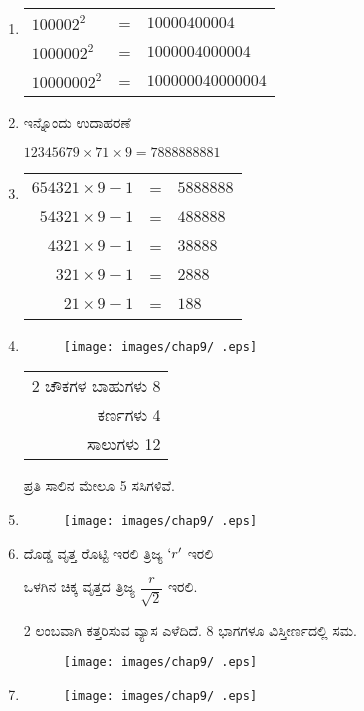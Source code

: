 \begin{enumerate}
\item 
\begin{tabular}[t]{lll}
$100002^{2}$ & = & $10000400004$\\
$1000002^{2}$ & = & $1000004000004$\\
$10000002^{2}$ & = & $100000040000004$\\
\end{tabular}

\item ಇನ್ನೊಂದು ಉದಾಹರಣೆ 

$12345679\times 71\times 9 = 7888888881$

\smallskip
\item 
\begin{tabular}[t]{rcl}
$654321\times 9 - 1$ & = & $5888888$\\
$54321\times 9 - 1$ & = & $488888$\\
$4321\times 9 - 1$ & = & $38888$\\
$321\times 9 - 1$ & = & $2888$\\
$21\times 9 - 1$ & = & $188$
\end{tabular}

\item 
\begin{figure}[!h]
\centering
\texttt{[image: images/chap9/ .eps]}
\end{figure}

\begin{tabular}[t]{r}
2 ಚೌಕಗಳ ಬಾಹುಗಳು 8 \\
ಕರ್ಣಗಳು 4\\
\hline
ಸಾಲುಗಳು 12\\
\hline
\end{tabular}

ಪ್ರತಿ ಸಾಲಿನ ಮೇಲೂ 5 ಸಸಿಗಳಿವೆ. 

\item 
\begin{figure}[!h]
\centering
\texttt{[image: images/chap9/ .eps]}
\end{figure}

\item ದೊಡ್ಡ ವೃತ್ತ ರೊಟ್ಟಿ ಇರಲಿ ತ್ರಿಜ್ಯ $`r'$ ಇರಲಿ 

ಒಳಗಿನ ಚಿಕ್ಕ ವೃತ್ತದ ತ್ರಿಜ್ಯ $\dfrac{r}{\sqrt{2}}$ ಇರಲಿ. 

2 ಲಂಬವಾಗಿ ಕತ್ತರಿಸುವ ವ್ಯಾಸ ಎಳೆದಿದೆ. 8 ಭಾಗಗಳೂ ವಿಸ್ತೀರ್ಣದಲ್ಲಿ ಸಮ. 
\begin{figure}[!h]
\centering
\texttt{[image: images/chap9/ .eps]}
\end{figure}

\item 
\begin{figure}[!h]
\centering
\texttt{[image: images/chap9/ .eps]}
\end{figure}


\end{enumerate}
